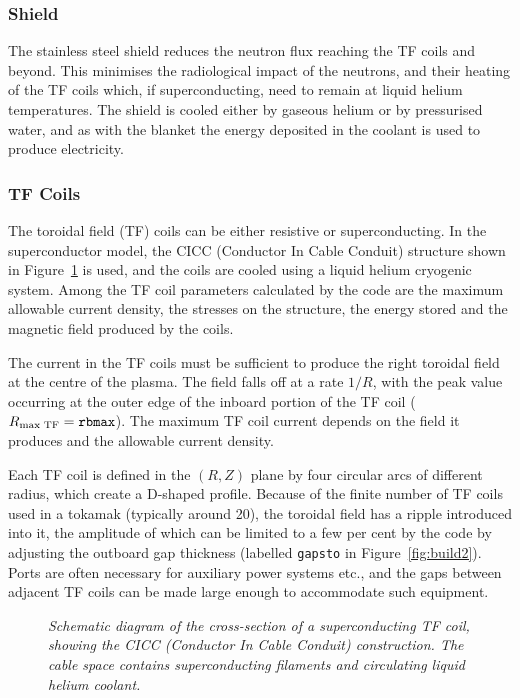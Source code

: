 \subsubsection{Shield}
The stainless steel shield reduces the neutron flux reaching the TF coils and
beyond. This minimises the radiological impact of the neutrons, and their
heating of the TF coils which, if superconducting, need to remain at liquid
helium temperatures. The shield is cooled either by gaseous helium or by
pressurised water, and as with the blanket the energy deposited in the coolant
is used to produce electricity.

\subsubsection{TF Coils}
The toroidal field (TF) coils can be either resistive or superconducting. In
the superconductor model, the CICC (Conductor In Cable Conduit) structure
shown in Figure~\ref{fig:CICC} is used, and the coils are cooled using a
liquid helium cryogenic system. Among the TF coil parameters calculated by the
code are the maximum allowable current density, the stresses on the structure,
the energy stored and the magnetic field produced by the coils.

The current in the TF coils must be sufficient to produce the right toroidal
field at the centre of the plasma. The field falls off at a rate $1/R$, with
the peak value occurring at the outer edge of the inboard portion of the TF
coil ($R_{\mbox{\scriptsize max TF}} = \mbox{\tt rbmax}$). The maximum TF coil
current depends on the field it produces and the allowable current density.

Each TF coil is defined in the $(R,Z)$ plane by four circular arcs of
different radius, which create a D-shaped profile. Because of the finite
number of TF coils used in a tokamak (typically around 20), the toroidal field
has a ripple introduced into it, the amplitude of which can be limited to a
few per cent by the code by adjusting the outboard gap thickness (labelled
{\tt gapsto} in Figure~\ref{fig:build2}).  Ports are often necessary for
auxiliary power systems etc., and the gaps between adjacent TF coils can be
made large enough to accommodate such equipment.

\begin{figure}
\centerline{}
\vspace{-12mm}
\caption[CICC]
{\it Schematic diagram of the cross-section of a superconducting TF coil,
showing the CICC (Conductor In Cable Conduit) construction. The cable space
contains superconducting filaments and circulating liquid helium coolant.}
\label{fig:CICC}
\end{figure}

